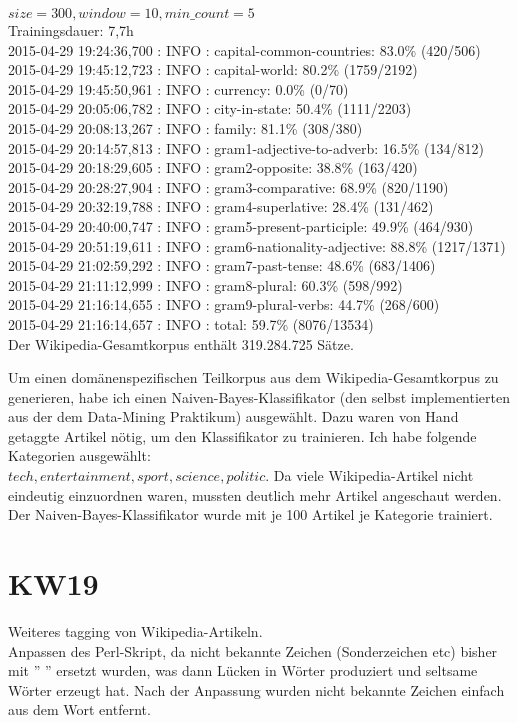 \documentclass[11pt,a4paper]{article}
\begin{document}
$size=300, window=10, min\_count=5$
\\Trainingsdauer: 7,7h
\\2015-04-29 19:24:36,700 : INFO : capital-common-countries: 83.0\% (420/506)
\\2015-04-29 19:45:12,723 : INFO : capital-world: 80.2\% (1759/2192)
\\2015-04-29 19:45:50,961 : INFO : currency: 0.0\% (0/70)
\\2015-04-29 20:05:06,782 : INFO : city-in-state: 50.4\% (1111/2203)
\\2015-04-29 20:08:13,267 : INFO : family: 81.1\% (308/380)
\\2015-04-29 20:14:57,813 : INFO : gram1-adjective-to-adverb: 16.5\% (134/812)
\\2015-04-29 20:18:29,605 : INFO : gram2-opposite: 38.8\% (163/420)
\\2015-04-29 20:28:27,904 : INFO : gram3-comparative: 68.9\% (820/1190)
\\2015-04-29 20:32:19,788 : INFO : gram4-superlative: 28.4\% (131/462)
\\2015-04-29 20:40:00,747 : INFO : gram5-present-participle: 49.9\% (464/930)
\\2015-04-29 20:51:19,611 : INFO : gram6-nationality-adjective: 88.8\% (1217/1371)
\\2015-04-29 21:02:59,292 : INFO : gram7-past-tense: 48.6\% (683/1406)
\\2015-04-29 21:11:12,999 : INFO : gram8-plural: 60.3\% (598/992)
\\2015-04-29 21:16:14,655 : INFO : gram9-plural-verbs: 44.7\% (268/600)
\\2015-04-29 21:16:14,657 : INFO : total: 59.7\% (8076/13534)
\\Der Wikipedia-Gesamtkorpus enthält 319.284.725 Sätze.

Um einen domänenspezifischen Teilkorpus aus dem Wikipedia-Gesamtkorpus zu generieren, habe ich einen Naiven-Bayes-Klassifikator (den selbst implementierten aus der dem Data-Mining Praktikum) ausgewählt. Dazu waren von Hand getaggte Artikel nötig, um den Klassifikator zu trainieren. Ich habe folgende Kategorien ausgewählt: \\$tech, entertainment, sport, science, politic$. Da viele Wikipedia-Artikel nicht eindeutig einzuordnen waren, mussten deutlich mehr Artikel angeschaut werden. Der Naiven-Bayes-Klassifikator wurde mit je 100 Artikel je Kategorie trainiert.

\section*{KW19}
Weiteres tagging von Wikipedia-Artikeln.
\\Anpassen des Perl-Skript, da nicht bekannte Zeichen (Sonderzeichen etc) bisher mit '' '' ersetzt wurden, was dann Lücken in Wörter produziert und seltsame Wörter erzeugt hat. Nach der Anpassung wurden nicht bekannte Zeichen einfach aus dem Wort entfernt.
\end{document}
